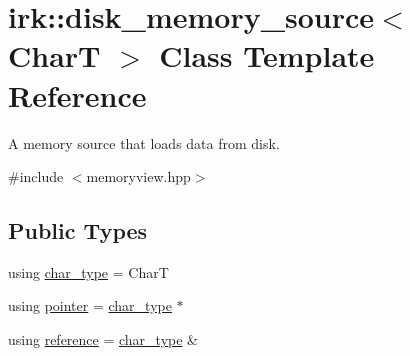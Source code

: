 \hypertarget{classirk_1_1disk__memory__source}{}\section{irk\+:\+:disk\+\_\+memory\+\_\+source$<$ CharT $>$ Class Template Reference}
\label{classirk_1_1disk__memory__source}


A memory source that loads data from disk.  




{\ttfamily \#include $<$memoryview.\+hpp$>$}

\subsection*{Public Types}
\begin{DoxyCompactItemize}
\item 
using \mbox{\hyperlink{classirk_1_1disk__memory__source_a029ab1ba55fc543025c42ee3d7320dca}{char\+\_\+type}} = CharT
\item 
using \mbox{\hyperlink{classirk_1_1disk__memory__source_afa8b094a876a7f219c11ddb08ec77c3f}{pointer}} = \mbox{\hyperlink{classirk_1_1disk__memory__source_a029ab1ba55fc543025c42ee3d7320dca}{char\+\_\+type}} $\ast$
\item 
using \mbox{\hyperlink{classirk_1_1disk__memory__source_ad150035660918d33c0f036e98781c59d}{reference}} = \mbox{\hyperlink{classirk_1_1disk__memory__source_a029ab1ba55fc543025c42ee3d7320dca}{char\+\_\+type}} \&
\end{DoxyCompactItemize}
